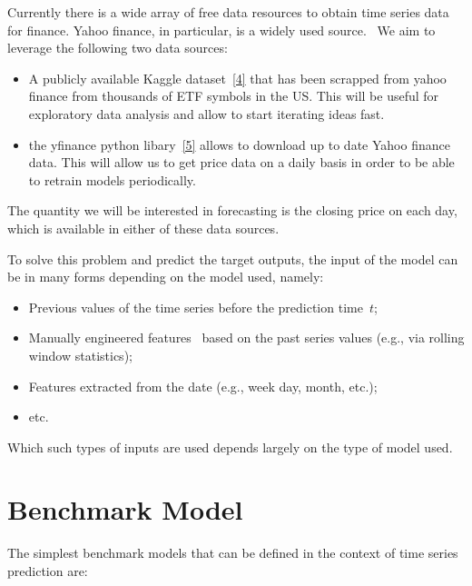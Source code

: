 \documentclass[10pt]{article}
\providecommand{\tightlist}{\setlength{\itemsep}{0pt}\setlength{\parskip}{0pt}}%
\begin{document}
{\label{273725}}

Currently there is a wide array of free data resources to obtain time
series data for finance. Yahoo finance, in particular, is a widely used
source.~ We aim to leverage the following two data sources:

\begin{itemize}
\tightlist
\item
  A publicly available Kaggle dataset~\hyperref[csl:4]{[4]} that has been
  scrapped from yahoo finance from thousands of ETF symbols in the US.
  This will be useful for exploratory data analysis and allow to start
  iterating ideas fast.
\item
  the yfinance python libary~\hyperref[csl:5]{[5]} allows to download up to
  date Yahoo finance data. This will allow us to get price data on a
  daily basis in order to be able to retrain models periodically.~
\end{itemize}

The quantity we will be interested in forecasting is the closing price
on each day, which is available in either of these data sources.

To solve this problem and predict the target outputs, the input of the
model can be in many forms depending on the model used, namely:

\begin{itemize}
\tightlist
\item
  Previous values of the time series before the prediction
  time~\(t\);~
\item
  Manually engineered features~ based on the past series values (e.g.,
  via rolling window statistics);
\item
  Features extracted from the date (e.g., week day, month, etc.);
\item
  etc.
\end{itemize}

Which such types of inputs are used depends largely on the type of model
used.~

\hypertarget{benchmark-model}{%
\section*{Benchmark Model}}

{\label{145318}}

The simplest benchmark models that can be defined in the context of time
series prediction are:
\end{document}
